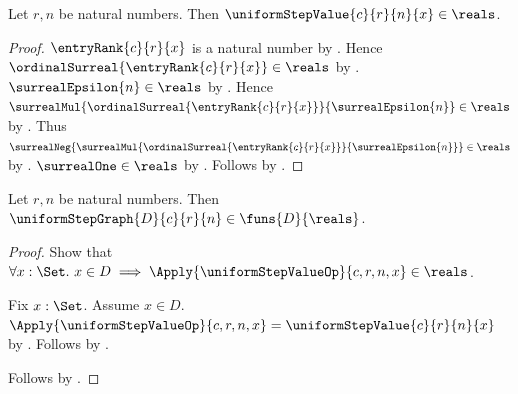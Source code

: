 \begin{proposition}\label{uniform_step_value_is_real}
    Let $r,n$ be natural numbers.
    Then $\uniformStepValue{c}{r}{n}{x}\in\reals$.
\end{proposition}
\begin{proof}
    $\entryRank{c}{r}{x}$ is a natural number
        by .
    Hence $\ordinalSurreal{\entryRank{c}{r}{x}}\in\reals$
        by .
    $\surrealEpsilon{n}\in\reals$
        by .
    Hence
        $\surrealMul{\ordinalSurreal{\entryRank{c}{r}{x}}}
            {\surrealEpsilon{n}}\in\reals$
        by .
    Thus
        $\surrealNeg{
            \surrealMul{\ordinalSurreal{\entryRank{c}{r}{x}}}
                {\surrealEpsilon{n}}}\in\reals$
        by .
    $\surrealOne\in\reals$ by .
    Follows by
        .
\end{proof}

\begin{theorem}\label{uniform_step_graph_typed}
    Let $r,n$ be natural numbers.
    Then $\uniformStepGraph{D}{c}{r}{n}\in\funs{D}{\reals}$.
\end{theorem}
\begin{proof}
    Show that $\forall x:\Set.\ x\in D\implies
        \Apply{\uniformStepValueOp}{c,r,n,x}
            \in\reals$.
    \begin{subproof}
        Fix $x:\Set$.
        Assume $x\in D$.
        $\Apply{\uniformStepValueOp}{c,r,n,x}
            =\uniformStepValue{c}{r}{n}{x}$
            by .
        Follows by .
    \end{subproof}
    Follows by
        .
\end{proof}

